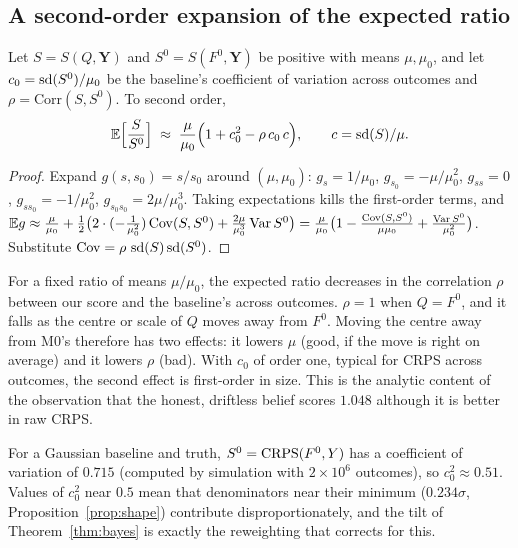 \subsection{A second-order expansion of the expected ratio}

\begin{theorem}\label{thm:ratioexp}
Let $S=S(Q,\bm Y)$ and $S^0=S(F^0,\bm Y)$ be positive with means $\mu,\mu_0$, and let $c_0=\operatorname{sd}(S^0)/\mu_0$ be the baseline's coefficient of
variation across outcomes and $\rho=\mathrm{Corr}(S,S^0)$. To second order,
\begin{equation}\label{eq:ratioexp}
  \mathbb{E}\Bigl[\frac{S}{S^0}\Bigr]\;\approx\;\frac{\mu}{\mu_0}\Bigl(1+c_0^2-\rho\,c_0\,c\Bigr),\qquad c=\operatorname{sd}(S)/\mu .
\end{equation}
\end{theorem}
\begin{proof}
Expand $g(s,s_0)=s/s_0$ around $(\mu,\mu_0)$: $g_{s}=1/\mu_0$, $g_{s_0}=-\mu/\mu_0^2$, $g_{ss}=0$, $g_{s s_0}=-1/\mu_0^2$, $g_{s_0s_0}=2\mu/\mu_0^3$.
Taking expectations kills the first-order terms, and
$\mathbb{E} g\approx\frac{\mu}{\mu_0}+\frac12\bigl(2\cdot(-\tfrac1{\mu_0^2})\operatorname{Cov}(S,S^0)+\tfrac{2\mu}{\mu_0^3}\operatorname{Var} S^0\bigr)
=\frac{\mu}{\mu_0}\bigl(1-\frac{\operatorname{Cov}(S,S^0)}{\mu\mu_0}+\frac{\operatorname{Var} S^0}{\mu_0^2}\bigr)$. Substitute $\operatorname{Cov}=\rho\,\operatorname{sd}(S)\operatorname{sd}(S^0)$.
\end{proof}

\begin{corollary}
For a fixed ratio of means $\mu/\mu_0$, the expected ratio decreases in the correlation $\rho$ between our score and the baseline's across
outcomes. $\rho=1$ when $Q=F^0$, and it falls as the centre or scale of $Q$ moves away from $F^0$. Moving the centre away from M0's therefore has
two effects: it lowers $\mu$ (good, if the move is right on average) and it lowers $\rho$ (bad). With $c_0$ of order one, typical for CRPS across
outcomes, the second effect is first-order in size. This is the analytic content of the observation that the honest, driftless belief scores
$1.048$ although it is better in raw CRPS.
\end{corollary}
\begin{remark}
For a Gaussian baseline and truth, $S^0=\operatorname{CRPS}(F^0,Y)$ has a coefficient of variation of $0.715$ (computed by simulation with $2\times10^6$ outcomes), so $c_0^2\approx0.51$. Values of $c_0^2$ near $0.5$ mean that
denominators near their minimum ($0.234\sigma$, Proposition~\ref{prop:shape}) contribute disproportionately, and the tilt of
Theorem~\ref{thm:bayes} is exactly the reweighting that corrects for this.
\end{remark}

